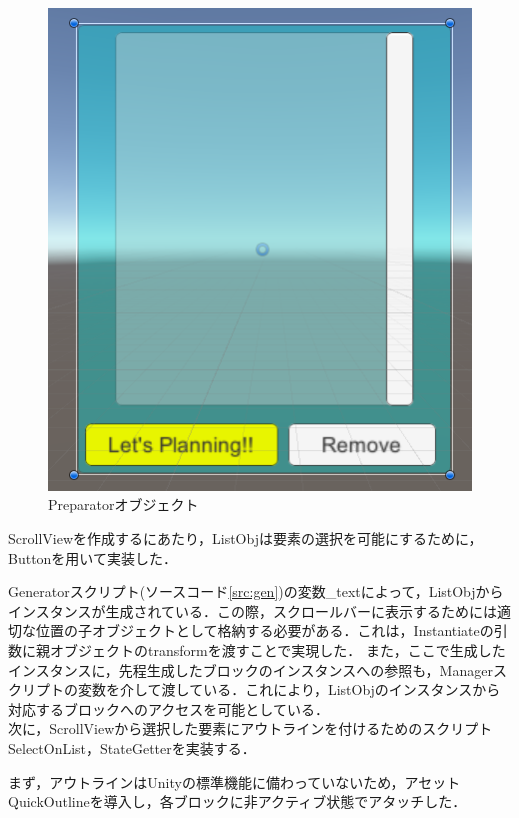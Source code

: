 \documentclass[12pt]{jarticle}
\begin{document}
\begin{figure}[!hbt]
  \begin{center}
    \includegraphics[scale=0.5]{images/BWP_Work6/preparator.png}
  \end{center}
  \caption{Preparatorオブジェクト}
  \label{fig:pre}
\end{figure}

ScrollViewを作成する\cite{sv}にあたり，ListObjは要素の選択を可能にするために，Buttonを用いて実装した．

Generatorスクリプト(ソースコード\ref{src:gen})の変数\_textによって，ListObjからインスタンスが生成されている．この際，スクロールバーに表示するためには適切な位置の子オブジェクトとして格納する必要がある．これは，Instantiateの引数に親オブジェクトのtransformを渡すことで実現した．
また，ここで生成したインスタンスに，先程生成したブロックのインスタンスへの参照も，Managerスクリプトの変数を介して渡している．これにより，ListObjのインスタンスから対応するブロックへのアクセスを可能としている． \\

次に，ScrollViewから選択した要素にアウトラインを付けるためのスクリプトSelectOnList，StateGetterを実装する．

まず，アウトラインはUnityの標準機能に備わっていないため，アセットQuickOutline\cite{outline}を導入し，各ブロックに非アクティブ状態でアタッチした．
\end{document}
